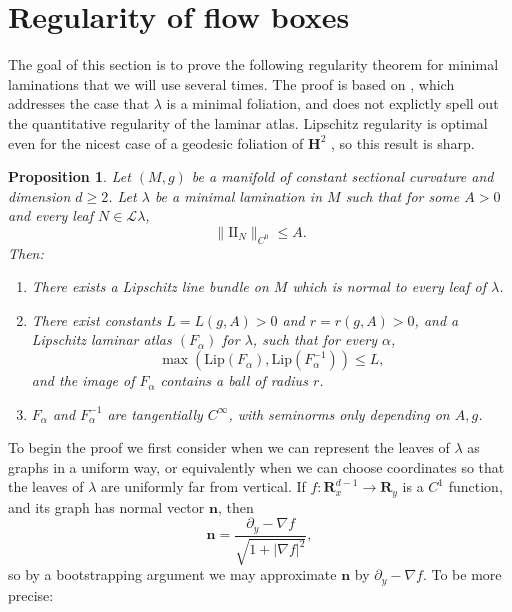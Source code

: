 \documentclass[reqno,11pt]{amsart}
\newcommand{\RR}{\mathbf{R}}
\newcommand{\Hyp}{\mathbf H}
\newcommand{\Leaves}{\mathscr L}
\newcommand{\Two}{\mathrm{I\!I}}
\newcommand{\normal}{\mathbf n}
\newcommand{\Lip}{\mathrm{Lip}}
\newtheorem{proposition}[theorem]{Proposition}
\theoremstyle{definition}
\numberwithin{equation}{section}
\begin{document}
\section{Regularity of flow boxes}\label{Regularity}
The goal of this section is to prove the following regularity theorem for minimal laminations that we will use several times.
The proof is based on \cite[Theorem 1.1]{Solomon86}, which addresses the case that $\lambda$ is a minimal foliation, and does not explictly spell out the quantitative regularity of the laminar atlas.
Lipschitz regularity is optimal even for the nicest case of a geodesic foliation of $\Hyp^2$ \cite[\S1]{Solomon86}, so this result is sharp.

\begin{proposition}\label{regularity theorem}
Let $(M, g)$ be a manifold of constant sectional curvature and dimension $d \geq 2$.
Let $\lambda$ be a minimal lamination in $M$ such that for some $A > 0$ and every leaf $N \in \Leaves \lambda$,
\begin{equation}\label{curvature bound in regularity}
	\|\Two_N\|_{C^0} \leq A.
\end{equation}
Then:
\begin{enumerate}
\item There exists a Lipschitz line bundle on $M$ which is normal to every leaf of $\lambda$.
\item There exist constants $L = L(g, A) > 0$ and $r = r(g, A) > 0$, and a Lipschitz laminar atlas $(F_\alpha)$ for $\lambda$, such that for every $\alpha$,
\begin{equation}\label{conorm of flow box}
	\max(\Lip(F_\alpha), \Lip(F_\alpha^{-1})) \leq L,
\end{equation}
and the image of $F_\alpha$ contains a ball of radius $r$.
\item $F_\alpha$ and $F_\alpha^{-1}$ are tangentially $C^\infty$, with seminorms only depending on $A, g$.
\end{enumerate}
\end{proposition}

To begin the proof we first consider when we can represent the leaves of $\lambda$ as graphs in a uniform way, or equivalently when we can choose coordinates so that the leaves of $\lambda$ are uniformly far from vertical.
If $f: \RR^{d - 1}_x \to \RR_y$ is a $C^1$ function, and its graph has normal vector $\normal$, then
\begin{equation}\label{nabla as a normal}
	\normal = \frac{\partial_y - \nabla f}{\sqrt{1 + |\nabla f|^2}},
\end{equation}
so by a bootstrapping argument we may approximate $\normal$ by $\partial_y - \nabla f$.
To be more precise:
\end{document}
